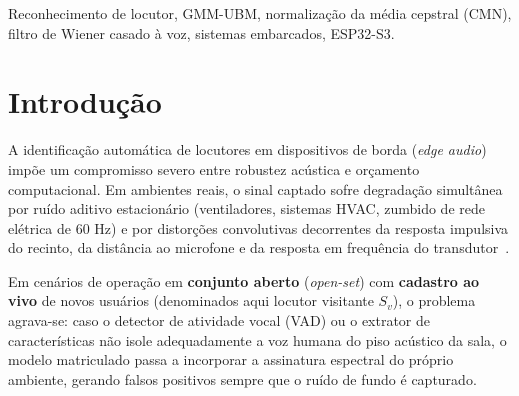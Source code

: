 \documentclass[9pt,technote,a4paper]{IEEEtran}
\begin{document}
\begin{abstract}
ocupando $2{,}19\text{ KiB}$ para o UBM e $2{,}0\text{ KiB}$ para o \textit{prior} vocal em Flash.
\end{abstract}

\begin{IEEEkeywords}
Reconhecimento de locutor, GMM-UBM, normalização da média cepstral (CMN), filtro de Wiener casado à voz, sistemas embarcados, ESP32-S3.
\end{IEEEkeywords}

\section{Introdução}
\label{sec:intro}

A identificação automática de locutores em dispositivos de borda (\textit{edge audio}) impõe um compromisso severo entre robustez acústica e orçamento computacional. Em ambientes reais, o sinal captado sofre degradação simultânea por ruído aditivo estacionário (ventiladores, sistemas HVAC, zumbido de rede elétrica de $60\text{ Hz}$) e por distorções convolutivas decorrentes da resposta impulsiva do recinto, da distância ao microfone e da resposta em frequência do transdutor~\cite{reynolds2000,furui1981,rabiner1993}.

Em cenários de operação em \textbf{conjunto aberto} (\textit{open-set}) com \textbf{cadastro ao vivo} de novos usuários (denominados aqui locutor visitante $S_v$), o problema agrava-se: caso o detector de atividade vocal (VAD) ou o extrator de características não isole adequadamente a voz humana do piso acústico da sala, o modelo matriculado passa a incorporar a assinatura espectral do próprio ambiente, gerando falsos positivos sempre que o ruído de fundo é capturado.
\end{document}
